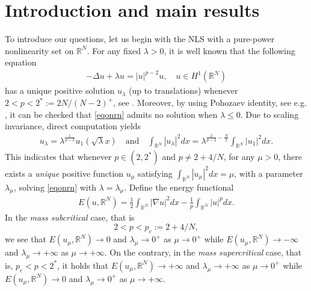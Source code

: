 \documentclass[10pt,a4paper]{article}
\theoremstyle{definition} \theoremstyle{remark}
\numberwithin{equation}{section}
\newcommand{\R}{\mathbb{R}}
\newcommand{\la}{\lambda}
\begin{document}
\newpage
\tableofcontents




\vskip0.66in




\section{Introduction and main results}

To introduce our questions, let us begin with the NLS with a pure-power nonlinearity set on $\R^N$. For any fixed $\la > 0$, it is well known that the following equation
\begin{align} \label{eqonrn}
	-\Delta u + \la u = |u|^{p-2}u, \quad u \in H^1(\R^N)
\end{align}
has a unique positive solution $u_\la$ (up to translations) whenever $2 < p < 2^*:= 2N/(N-2)^+$, see \cite{Kwong}. Moreover, by using Pohozaev identity, see e.g. \cite[Appendix B]{Willem}, it can be checked that \eqref{eqonrn} admits no solution when $\la \leq 0$. Due to scaling invariance, direct computation yields
\begin{align*}
	u_\la = \la^{\frac1{p-2}}u_1(\sqrt{\la}x) \quad \text{and} \quad \int_{\R^N}|u_\la|^2dx = \la^{\frac2{p-2}-\frac N2}\int_{\R^N}|u_1|^2dx.
\end{align*}
This indicates that whenever $p \in (2,2^*)$ and $p \neq 2 + 4/N$, for any $\mu > 0$, there exists a \emph{unique} positive function $u_\mu$ satisfying $\int_{\R^N}|u_\mu|^2dx = \mu$, with a parameter $\la_\mu$, solving \eqref{eqonrn} with $\la = \la_\mu$. Define the energy functional
\begin{align*}
	E(u,\R^N) = \frac12\int_{\R^N}|\nabla u|^2dx - \frac1p\int_{\R^N}|u|^pdx.
\end{align*}
In the \emph{mass subcritical} case, that is $$2 < p < p_c := 2 + 4/N,$$ we see that $E(u_\mu,\R^N) \to 0$ and $\la_\mu \to 0^+$ as $\mu \to 0^+$ while $E(u_\mu,\R^N) \to -\infty$ and $\la_\mu \to +\infty$ as $\mu \to +\infty$. On the contrary, in the \emph{mass supercritical} case, that is, $p_c < p <2^*$, it holds that $E(u_\mu,\R^N) \to +\infty$ and $\la_\mu \to +\infty$ as $\mu \to 0^+$ while $E(u_\mu,\R^N) \to 0$ and $\la_\mu \to 0^+$ as $\mu \to +\infty$. %

\vskip0.1in
\end{document}
